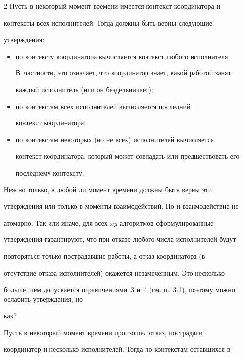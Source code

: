 \begin{multicols}{2}
      Пусть в некоторый момент времени имеется контекст координатора и 


контексты всех исполнителей. Тогда должны быть верны следующие 


утверждения:


      \begin{itemize}


\item по контексту координатора вычисляется контекст любого исполнителя. 


В~част\-ности, это означает, что координатор знает, какой работой занят 


каждый исполнитель (или он бездельничает);


\item по контекстам всех исполнителей вычисляется последний 


контекст координатора;


\item по контекстам некоторых (но не всех) исполнителей вычисляется 


контекст координатора, который может совпадать или предшествовать его 


последнему контексту.


\end{itemize}





      Неясно только, в любой ли момент времени должны быть верны эти 


утверждения или только в моменты взаимодействий. Но и взаимодействие не 


атомарно. Так или иначе, для всех $xy$-ал\-го\-рит\-мов сформулированные 


утверждения гарантируют, что при отказе любого числа исполнителей будут 


повторяться только пострадавшие работы, а отказ координатора (в 


отсутствие отказа исполнителей) окажется незамеченным. Это несколько 


больше, чем допускается ограничениями~3 и~4 (см. п.~3.1), поэтому можно ослабить утверждения, но 


как?


      


      Пусть в некоторый момент времени произошел отказ, пострадали 


координатор и несколько исполнителей. Тогда по контекстам оставшихся в 



\end{multicols}
